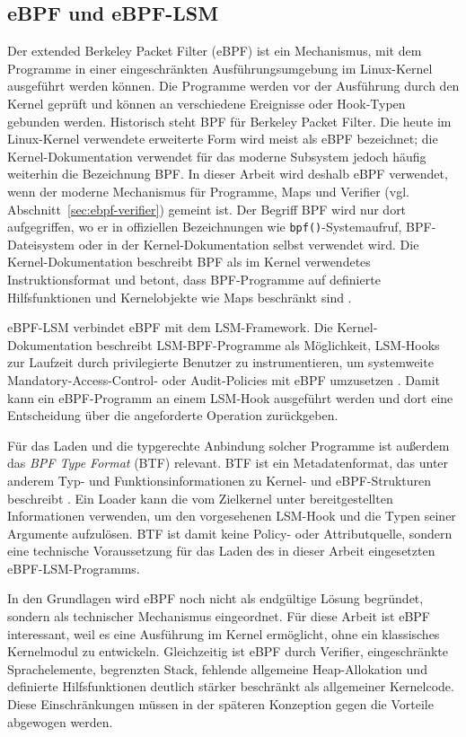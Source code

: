 \subsection{eBPF und eBPF-LSM}
Der extended Berkeley Packet Filter (eBPF) ist ein Mechanismus, mit dem Programme in einer eingeschränkten Ausführungsumgebung im Linux-Kernel ausgeführt werden können.
Die Programme werden vor der Ausführung durch den Kernel geprüft und können an verschiedene Ereignisse oder Hook-Typen gebunden werden. 
Historisch steht BPF für Berkeley Packet Filter. 
Die heute im Linux-Kernel verwendete erweiterte Form wird meist als eBPF bezeichnet; die Kernel-Dokumentation verwendet für das moderne Subsystem jedoch häufig weiterhin die Bezeichnung BPF. 
In dieser Arbeit wird deshalb eBPF verwendet, wenn der moderne Mechanismus für Programme, Maps und Verifier (vgl. Abschnitt~\ref{sec:ebpf-verifier}) gemeint ist.
Der Begriff BPF wird nur dort aufgegriffen, wo er in offiziellen Bezeichnungen wie \texttt{bpf()}-Systemaufruf, BPF-Dateisystem oder in der Kernel-Dokumentation selbst verwendet wird.
Die Kernel-Dokumentation beschreibt BPF als im Kernel verwendetes Instruktionsformat und betont, dass BPF-Programme auf definierte Hilfsfunktionen und Kernelobjekte wie Maps beschränkt sind \citep{kernelBpfDesignQA}.

eBPF-LSM verbindet eBPF mit dem LSM-Framework. 
Die Kernel-Dokumentation beschreibt LSM-BPF-Programme als Möglichkeit, LSM-Hooks zur Laufzeit durch privilegierte Benutzer zu instrumentieren, um systemweite Mandatory-Access-Control- oder Audit-Policies mit eBPF umzusetzen \citep{kernelBpfLsm}. 
Damit kann ein eBPF-Programm an einem LSM-Hook ausgeführt werden und dort eine Entscheidung über die angeforderte Operation zurückgeben.

Für das Laden und die typgerechte Anbindung solcher Programme ist außerdem das \emph{BPF Type Format} (BTF) relevant.
BTF ist ein Metadatenformat, das unter anderem Typ- und Funktionsinformationen zu Kernel- und eBPF-Strukturen beschreibt \citep{kernelBtf}.
Ein Loader kann die vom Zielkernel unter bereitgestellten Informationen verwenden, um den vorgesehenen LSM-Hook und die Typen seiner Argumente aufzulösen.
BTF ist damit keine Policy- oder Attributquelle, sondern eine technische Voraussetzung für das Laden des in dieser Arbeit eingesetzten eBPF-LSM-Programms.

In den Grundlagen wird eBPF noch nicht als endgültige Lösung begründet, sondern als technischer Mechanismus eingeordnet. 
Für diese Arbeit ist eBPF interessant, weil es eine Ausführung im Kernel ermöglicht, ohne ein klassisches Kernelmodul zu entwickeln. 
Gleichzeitig ist eBPF durch Verifier, eingeschränkte Sprachelemente, begrenzten Stack, fehlende allgemeine Heap-Allokation und definierte Hilfsfunktionen deutlich stärker beschränkt als allgemeiner Kernelcode. 
Diese Einschränkungen müssen in der späteren Konzeption gegen die Vorteile abgewogen werden.

